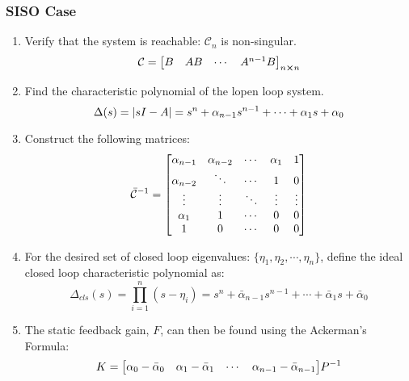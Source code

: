 \documentclass[]{article}
\newcommand{\ctrb}{\mathcal{C}}
\begin{document}
	\subsubsection*{SISO Case}

		\begin{enumerate}
			\item Verify that the system is reachable: $\ctrb_n$ is non-singular.
			\begin{displaymath}
				\ctrb = \mqty[B	&AB	&\cdots	& A^{n-1}B]_{n\cross n}
			\end{displaymath}
			\item Find the characteristic polynomial of the lopen loop system.
			\begin{displaymath}
				\Delta(s) = \abs{sI-A} = s^n + \alpha_{n-1} s^{n-1} + \cdots + \alpha_1 s + \alpha_0
			\end{displaymath}
%				
			\item Construct the following matrices:
			\begin{displaymath}
				\bar{\ctrb}^{-1} = \mqty[\alpha_{n-1} & \alpha_{n-2} & \cdots & \alpha_1 & 1 \\
				\alpha_{n-2} & \ddots       & \cdots & 1        & 0 \\
				\vdots       & \vdots       & \ddots & \vdots   & \vdots \\
				\alpha_1     & 1            & \cdots & 0        & 0 \\
				1            & 0            & \cdots & 0        & 0]
			\end{displaymath}
			\item For the desired set of closed loop eigenvalues: $\{\eta_1, \eta_2, \cdots, \eta_n\}$, define the ideal closed loop characteristic polynomial as:
			\begin{displaymath}
				\Delta_{cls}(s) = \prod_{i=1}^{n} (s-\eta_i) = s^n + \bar{\alpha}_{n-1} s^{n-1} + \cdots + \bar{\alpha}_1 s + \bar{\alpha}_0
			\end{displaymath}
			\item The static feedback gain, $F$, can then be found using the Ackerman's Formula:
			\begin{displaymath}
				K = \mqty[\alpha_0-\bar{\alpha}_0	&\alpha_1-\bar{\alpha}_1	& \cdots	& \alpha_{n-1}-\bar{\alpha}_{n-1}] P^{-1}
			\end{displaymath}
		\end{enumerate}
\end{document}
